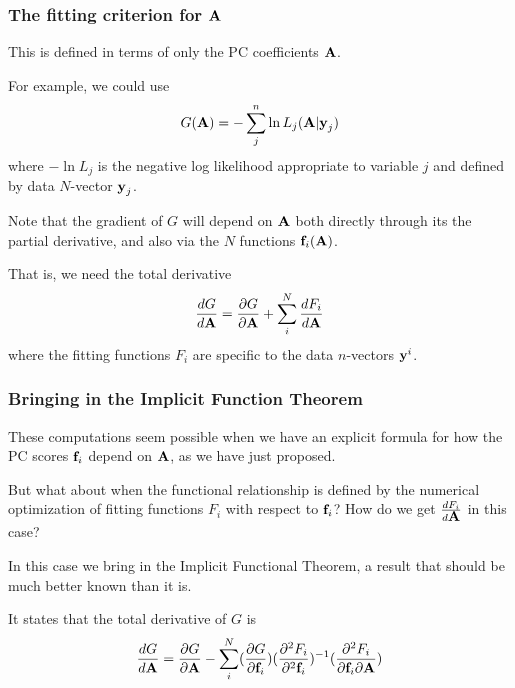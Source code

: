 \documentclass[11pt]{beamer}
\begin{document}

\begin{frame}

\frametitle{The fitting criterion for $\mbox{\bf A}$}

\bi
  \item This is defined in terms of only the PC coefficients $\mbox{\bf A}$.
  \item For example, we could use
  \[
    G(\mbox{\bf A}) = -\sum_j^n \ln L_j(\mbox{\bf A}|\mbox{\bf y}_j)
  \]
  where $-\ln L_j$ is the negative log likelihood appropriate to variable $j$ and
  defined by data $N$-vector $\mbox{\bf y}_j$.
  \item Note that the gradient of $G$ will depend on $\mbox{\bf A}$ both directly through its the partial derivative, and also via the $N$ functions $\mbox{\bf f}_i(\mbox{\bf A})$.
  \item That is, we need the total derivative
  \[
    \frac{dG}{d \mbox{\bf A}} = \frac{\partial G}{\partial \mbox{\bf A}} + \sum_i^N \frac{dF_i}{d \mbox{\bf A}}
  \]
  where the fitting functions $F_i$ are specific to the data $n$-vectors $\mbox{\bf y}^i$.
\ei

\end{frame}


\begin{frame}

\frametitle{Bringing in the Implicit Function Theorem}

\bi
  \item These computations seem possible when we have an explicit formula for how
  the PC scores $\mbox{\bf f}_i$ depend on $\mbox{\bf A}$, as we have just proposed.
  \item But what about when the functional relationship is defined by the numerical
  optimization of fitting functions $F_i$ with respect to $\mbox{\bf f}_i$?  How do we get
  $\frac{dF_i}{d \mbox{\bf A}}$ in this case?
  \item In this case we bring in the Implicit Functional Theorem, a result that
  should be much better known than it is.
  \item It states that the total derivative of $G$ is
  \[
    \frac{dG}{d \mbox{\bf A}} = \frac{\partial G}{\partial \mbox{\bf A}} -
    \sum_i^N (\frac{\partial G}{\partial \mbox{\bf f}_i}) (\frac{\partial^2 F_i}{\partial^2 \mbox{\bf f}_i})^{-1}
    (\frac{\partial^2 F_i}{\partial \mbox{\bf f}_i \partial \mbox{\bf A}})
  \]
\ei

\end{frame}
\end{document}

